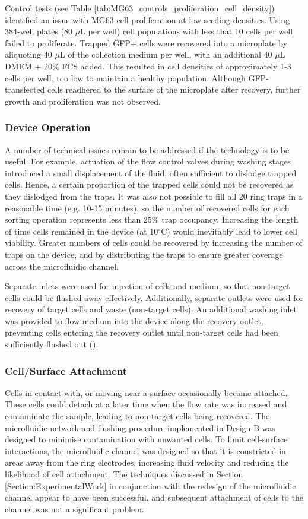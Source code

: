Control tests (see Table \ref{tab:MG63_controls_proliferation_cell_density}) identified an issue with MG63 cell proliferation at low seeding densities. Using 384-well plates (80 $\mu$L per well) cell populations with less that 10 cells per well failed to proliferate. Trapped GFP+ cells were recovered into a microplate by aliquoting 40 $\mu$L of the collection medium per well, with an additional 40 $\mu$L DMEM + 20$\%$ FCS added. This resulted in cell densities of approximately 1-3 cells per well, too low to maintain a healthy population. Although GFP-transfected cells readhered to the surface of the microplate after recovery, further growth and proliferation was not observed. 

\subsubsection{Device Operation}
A number of technical issues remain to be addressed if the technology is to be useful. For example, actuation of the flow control valves during washing stages introduced a small displacement of the fluid, often sufficient to dislodge trapped cells. Hence, a certain proportion of the trapped cells could not be recovered as they dislodged from the traps. It was also not possible to fill all 20 ring traps in a reasonable time (e.g. 10-15 minutes), so the number of recovered cells for each sorting operation represents less than 25\% trap occupancy. Increasing the length of time cells remained in the device (at 10$^\circ$C) would inevitably lead to lower cell viability. Greater numbers of cells could be recovered by increasing the number of traps on the device, and by distributing the traps to ensure greater coverage across the microfluidic channel.

Separate inlets were used for injection of cells and medium, so that non-target cells could be flushed away effectively. Additionally, separate outlets were used for recovery of target cells and waste (non-target cells).  An additional washing inlet was provided to flow medium into the device along the recovery outlet, preventing cells entering the recovery outlet until non-target cells had been sufficiently flushed out ().

\subsubsection{Cell/Surface Attachment}
Cells in contact with, or moving near a surface occasionally became attached. These cells could detach at a later time when the flow rate was increased and contaminate the sample, leading to non-target cells being recovered. The microfluidic network and flushing procedure implemented in Design B was designed to minimise contamination with unwanted cells. To limit cell-surface interactions, the microfluidic channel was designed so that it is constricted in areas away from the ring electrodes, increasing fluid velocity and reducing the likelihood of cell attachment. The techniques discussed in Section \ref{Section:ExperimentalWork} in conjunction with the redesign of the microfluidic channel appear to have been successful, and subsequent attachment of cells to the channel was not a significant problem. 

